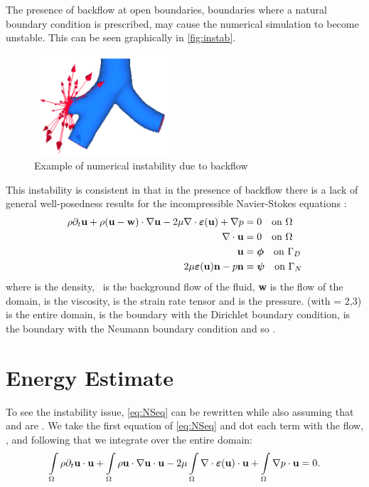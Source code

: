 The presence of backflow at open boundaries, boundaries where a natural boundary condition is prescribed, may cause the numerical simulation to become unstable. This can be seen graphically in \autoref{fig:instab}. 
\begin{figure}[t]
\centering
\includegraphics[width=5cm]{media/instability.PNG}
\caption{Example of numerical instability due to backflow\label{fig:instab}}
\end{figure}
This instability is consistent in that in the presence of backflow there is a lack of general well-posedness results for the incompressible Navier-Stokes equations \cite[429--430]{alfioquarteroni2014}: \begin{align}\label{eq:NSeq}\begin{split}
 \rho\partial_t{\textbf{u}} + \rho({\textbf{u}} - \textbf{w})\cdot\nabla{\textbf{u}} - 2\mu\nabla\cdot\bm{\varepsilon}({\textbf{u}}) + \nabla p &= 0\quad\text{on}~\Omega \\ \nabla\cdot{\textbf{u}} &= 0\quad\text{on}~\Omega \\
 {\textbf{u}} &= \bm{\phi}\quad\text{on}~\Gamma_D\\
 2\mu\bm{\varepsilon}({\textbf{u}}){\textbf{n}} - p{\textbf{n}} &= \bm{\psi}\quad\text{on}~\Gamma_N
 \end{split}\end{align}
 where \mathm{\rho} is the density, \bmu~is the background flow of the fluid, \textbf{w} is the flow of the domain, \mathm{\mu} is the viscosity, \mathm{\bm{\varepsilon}(\bmu)} is the strain rate tensor and  is the pressure. (with  = 2,3) is the entire domain,  is the boundary with the Dirichlet boundary condition,  is the boundary with the Neumann boundary condition and so . 
 
 \section{Energy Estimate}
 To see the instability issue, \autoref{eq:NSeq} can be rewritten while also assuming that \mathm{\phi} and \mathm{\psi} are . We take the first equation of \eqref{eq:NSeq} and dot each term with the flow, \bmu, and following that we integrate over the entire domain:
 \begin{equation}\label{eq:NSenergy1}
     \int\limits_{\Omega}\rho\partial_t{\textbf{u}} \cdot {\textbf{u}} + \int\limits_{\Omega}\rho{\textbf{u}}\cdot\nabla{\textbf{u}} \cdot {\textbf{u}} - 2\mu\int\limits_{\Omega}\nabla\cdot\bm{\varepsilon}({\textbf{u}}) \cdot {\textbf{u}} + \int\limits_{\Omega}\nabla p \cdot {\textbf{u}} = 0.
 \end{equation}
 
